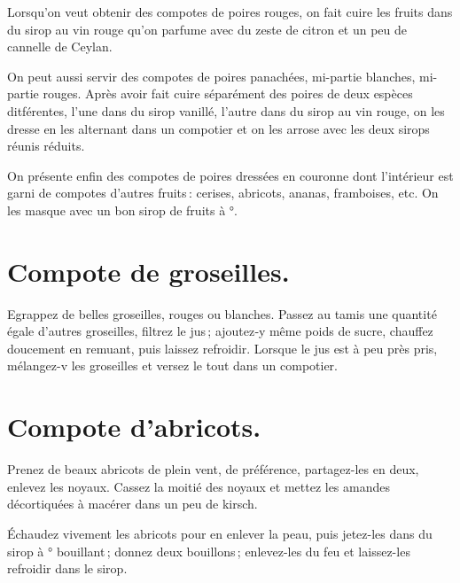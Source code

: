 \medskip

Lorsqu'on veut obtenir des compotes de poires rouges, on fait cuire les fruits
dans du sirop au vin rouge qu'on parfume avec du zeste de citron et un peu de
cannelle de Ceylan.

\sk

On peut aussi servir des compotes de poires panachées, mi-partie blanches,
mi-partie rouges. Après avoir fait cuire séparément des poires de deux espèces
ditférentes, l’une dans du sirop vanillé, l'autre dans du sirop au vin rouge,
on les dresse en les alternant dans un compotier et on les arrose avec les deux
sirops réunis réduits.

\sk

On présente enfin des compotes de poires dressées en couronne dont l'intérieur
est garni de compotes d'autres fruits : cerises, abricots, ananas, framboises,
etc. On les masque avec un bon sirop de fruits à {\mmm}°.

\section*{\centering Compote de groseilles.}
{}

Egrappez de belles groseilles, rouges ou blanches. Passez au tamis une quantité
égale d'autres groseilles, filtrez le jus ; ajoutez‑y même poids de sucre,
chauffez doucement en remuant, puis laissez refroidir. Lorsque le jus est à peu
près pris, mélangez-v les groseilles et versez le tout dans un compotier.

\section*{\centering Compote d’abricots.}
{}

Prenez de beaux abricots de plein vent, de préférence, partagez-les en deux,
enlevez les noyaux. Cassez la moitié des noyaux et mettez les amandes
décortiquées à macérer dans un peu de kirsch.

Échaudez vivement les abricots pour en enlever la peau, puis jetez-les dans du
sirop à {\mmm}° bouillant ; donnez deux bouillons ; enlevez-les du feu et
laissez-les refroidir dans le sirop.


